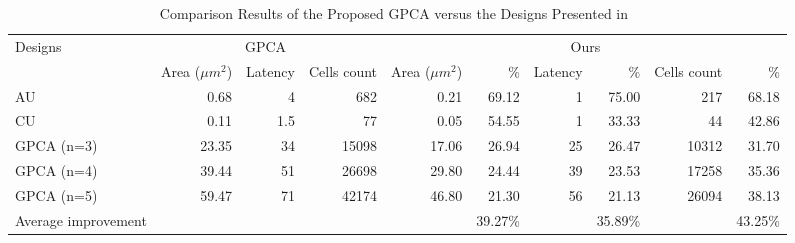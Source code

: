 \documentclass[9pt,journal,compsoc]{IEEEtran}
\begin{document}
\begin{table}[h]
\caption{Comparison Results of the Proposed GPCA versus the Designs Presented in~\cite{2}}\vspace{-3ex}
\centering
\begin{tabularx}{\textwidth}{Xrrrrrrrrr}
\toprule
            \multirow{2}{*}{Designs}& \multicolumn{3}{c}{GPCA~\cite{2}}&\multicolumn{6}{c}{ Ours }\\
            \cmidrule(lr){2-4} \cmidrule(lr){5-10}
            &Area ($\mu m^2$) & Latency & Cells count &Area ($\mu m^2$) & \% &Latency & \% & Cells count &\% \\
            \midrule
            AU &0.68 &4 &682 &0.21 &69.12 &1 &75.00 &217 &68.18 \\
            CU & 0.11&1.5&77&0.05&54.55&1&33.33&44&42.86\\
            GPCA (n=3)&23.35&34&15098&17.06&26.94&25&26.47&10312&31.70\\
            GPCA (n=4)&39.44&51&26698&29.80&24.44&39&23.53&17258&35.36\\
            GPCA (n=5)&59.47&71&42174&46.80&21.30&56&21.13&26094&38.13\\
            \midrule
            Average improvement&  &  & & & 39.27\% & &35.89\% && 43.25\% \\
            \bottomrule
\end{tabularx}~\label{tab:result}\vspace{-3ex}
\end{table}
\end{document}
